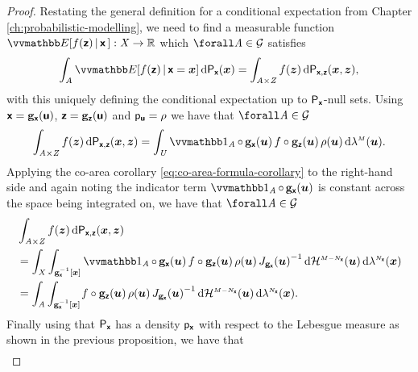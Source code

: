 \begin{proof}
Restating the general definition for a conditional expectation from Chapter \ref{ch:probabilistic-modelling}, we need to find a measurable function $\expc{f(\rvct{z}) \gvn \rvct{x}\,} : \set{X} \to \reals$ which $\forall\set{A} \in \sset{G}$ satisfies
\begin{equation*}
  \int_{\set{A}}
    \expc{f(\rvct{z}) \gvn \rvct{x} = \vct{x}} 
  \,\dr\prob{\rvct{x}}(\vct{x}) =
  \int_{\set{A} \times \set{Z}}
    f(\vct{z}) 
  \,\dr\prob{\rvct{x},\rvct{z}}(\vct{x},\vct{z}),
\end{equation*}
with this uniquely defining the conditional expectation up to $\mathsf{P}_{\boldsymbol{\mathsf{x}}}$-null sets. Using $\boldsymbol{\mathsf{x}} = {\mathbf{g}}_{\boldsymbol{\mathsf{x}}}(\boldsymbol{\mathsf{u}})$, $\boldsymbol{\mathsf{z}} = {\mathbf{g}}_{\boldsymbol{\mathsf{z}}}(\boldsymbol{\mathsf{u}})$ and $\mathsf{p}_{\boldsymbol{\mathsf{u}}} = \rho$ we have that $\forall\set{A} \in \sset{G}$
\begin{equation*}
  \int_{\set{A} \times \set{Z}}
    f(\vct{z}) 
  \,\dr\prob{\rvct{x},\rvct{z}}(\vct{x},\vct{z}) =
  \int_{\set{U}}
  \ind{\set{A}}\circ\,\genfunc_{\rvct{x}}(\vct{u})\,
  f\circ\genfunc_{\rvct{z}}(\vct{u})\,
  \rho(\vct{u})
  \,\dr\lebm{M}(\vct{u}).
\end{equation*}
Applying the co-area corollary \eqref{eq:co-area-formula-corollary} to the right-hand side and again noting the indicator term $\ind{\set{A}}\circ\,\genfunc_{\rvct{x}}(\vct{u})$ is constant across the space being integrated on, we have that $\forall \set{A} \in\sset{G}$
\begin{align*}
  &\int_{\set{A} \times \set{Z}}
    f(\vct{z}) 
  \,\dr\prob{\rvct{x},\rvct{z}}(\vct{x},\vct{z})\\
  &=
  \int_{\set{X}} \int_{\preimage{\genfunc_{\rvct{x}}}{\vct{x}}}
   \ind{\set{A}}\circ\,\genfunc_{\rvct{x}}(\vct{u})\,
   f\circ\genfunc_{\rvct{z}}(\vct{u})\,
   \rho(\vct{u})\,
   \jacobproddet{\genfunc_{\rvct{x}}}{\vct{u}}^{-1}
  \,\dr\haum{M-{N_{\rvct{x}}}}(\vct{u})
  \,\dr\lebm{N_{\rvct{x}}}(\vct{x})
  \\
  &=
  \int_{\set{A}}
  \int_{\preimage{\genfunc_{\rvct{x}}}{\vct{x}}}\kern-1pt
   f\circ\genfunc_{\rvct{z}}(\vct{u})\,
   \rho(\vct{u})\,
   \jacobproddet{\genfunc_{\rvct{x}}}{\vct{u}}^{-1}
  \,\dr\haum{M-{N_{\rvct{x}}}}(\vct{u})
  \,\dr\lebm{N_{\rvct{x}}}(\vct{x}).
\end{align*}
Finally using that $\mathsf{P}_{\boldsymbol{\mathsf{x}}}$ has a density $\mathsf{p}_{\boldsymbol{\mathsf{x}}}$ with respect to the Lebesgue measure as shown in the previous proposition, we have that
\begin{equation*}
\begin{split}

\end{split}
\end{equation*}
\end{proof}
